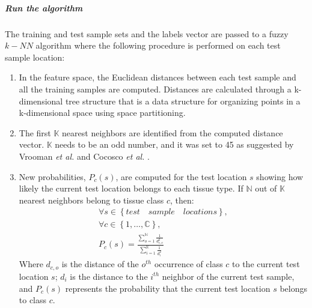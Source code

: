 \subparagraph*{Run the algorithm} %

The training and test sample sets and the labels vector are passed to a fuzzy $k-NN$ algorithm
where the following procedure is performed on each test sample location:

\begin{enumerate}
\item In the feature space, the Euclidean distances between each test sample and all the training samples are computed.
Distances are calculated through a k-dimensional tree structure \cite{Bentley75} that is a data structure for organizing points in a k-dimensional space using space partitioning.

\item The first $\mathbb{K}$ nearest neighbors are identified from the computed distance vector. $\mathbb{K}$ needs to be an odd number, and it was set to 45 as suggested by Vrooman \emph{et al.} \cite{Vrooman2007} and Cocosco \emph{et al.} \cite{Cocosco2003}.

\item
New probabilities, $P_c(s)$, are computed for the test location $s$ showing how likely the current test location belongs to each tissue type.
If $\mathbb{N}$ out of $\mathbb{K}$ nearest neighbors belong to tissue class $c$, then:
\begin{equation}
\begin{gathered}
\forall s\in \left\{test \quad sample \quad locations\right\}, \\
\forall c\in \left\{1,\ldots, \mathbb{C}\right\}, \\
P_c(s) = \frac{ \sum_{o=1}^{\mathbb{N}} \frac{1}{d_{c,o}^2} }{ \sum_{i=1}^{\mathbb{K}} \frac{1}{d_{i}^2} }
\end{gathered}
\end{equation}
Where $d_{c,o}$ is the distance of the $o^{th}$ occurrence of class $c$ to the current test location $s$; $d_{i}$ is the distance to the $i^{th}$ neighbor of the current test sample, and $P_c(s)$ represents the probability that the current test location $s$ belongs to class $c$.


\end{enumerate}

